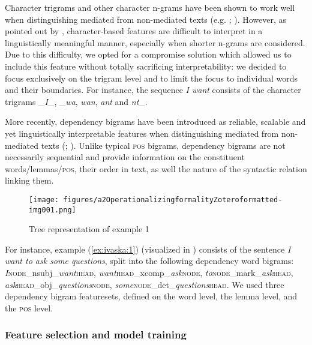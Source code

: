 \documentclass[output=paper]{langscibook}
\begin{document}
Character trigrams and other character n-grams have been shown to work well when distinguishing mediated from non-mediated texts (e.g. \citealt{Popescu2011}; \citealt{VolanskyEtAl2015}). However, as pointed out by \citet[113]{VolanskyEtAl2015}, character-based features are difficult to interpret in a linguistically meaningful manner, especially when shorter n-grams are considered. Due to this difficulty, we opted for a compromise solution which allowed us to include this feature without totally sacrificing interpretability: we decided to focus exclusively on the trigram level and to limit the focus to individual words and their boundaries. For instance, the sequence \textit{I want} consists of the character trigrams \textit{\_I\_}, \textit{\_wa}, \textit{wan}, \textit{ant} and \textit{nt\_}.

More recently, dependency bigrams have been introduced as reliable, scalable and yet linguistically interpretable features when distinguishing mediated from non-mediated texts (\citealt{IvaskaBernardini2020}; \citealt{ivaska_syntactic_2022}). Unlike typical \textsc{pos} bigrams, dependency bigrams are not necessarily sequential and provide information on the constituent words/lemmas/\textsc{pos}, their order in text, as well the nature of the syntactic relation linking them. 

\begin{figure}
\texttt{[image: figures/a2OperationalizingformalityZoteroformatted-img001.png]}

\caption{Tree representation of example 1}
\label{fig:ivaska:1}
\end{figure}

For instance, example (\ref{ex:ivaska:1}) (visualized in ) consists of the sentence \textit{I want to ask some questions}, split into the following dependency word bigrams: \textit{I}\textsc{node}\_nsubj\_\textit{want}\textsc{head}, \textit{want}\textsc{head}\_xcomp\_\textit{ask}\textsc{node}, \textit{to}\textsc{node}\_mark\_\textit{ask}\textsc{head}, \textit{ask}\textsc{head}\_obj\_\textit{questions}\textsc{node}, \textit{some}\textsc{node}\_det\_\textit{questions}\textsc{head}. We used three dependency bigram featuresets, defined on the word level, the lemma level, and the \textsc{pos} level.


\subsubsection{Feature selection and model training}\label{sec:ivaska:3.2.4}
\end{document}
